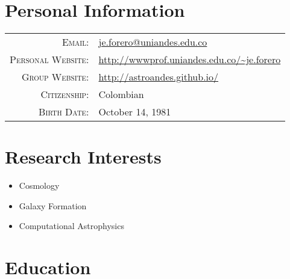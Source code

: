 \documentclass[a4paper,10pt]{article} %
\begin{document}




\par{ \bigskip\par} %

\color{red}
\section{Personal Information}
\color{black}


\begin{tabular}{rl}
\textsc{Email:} & \href{mailto:je.forero@uniandes.edu.co}{je.forero@uniandes.edu.co}\\
\textsc{Personal Website:} & \url{http://wwwprof.uniandes.edu.co/~je.forero}\\
\textsc{Group Website:} & \url{http://astroandes.github.io/}\\ 
\textsc{Citizenship:} & Colombian\\
\textsc{Birth Date:} & October 14, 1981\\
\end{tabular}



\color{red}
\section{Research Interests}
\color{black}
\begin{itemize}
\item{Cosmology} 
\item{Galaxy Formation}
\item{Computational Astrophysics}
\end{itemize}


\color{red}
\section{Education}
\color{black}
\end{document}
